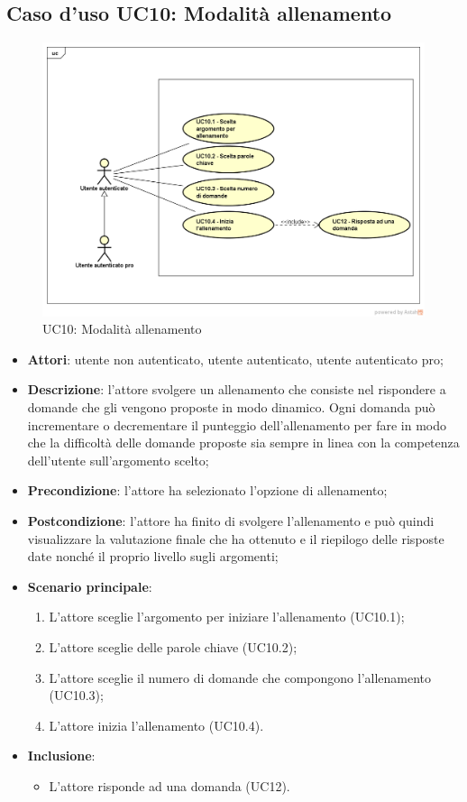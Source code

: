 \subsection{Caso d'uso UC10: Modalità allenamento}
\label{UC10}
	\begin{figure}
	\centering
	\includegraphics[scale=0.5]{UML/UC10.png}
	\caption{UC10: Modalità allenamento}
	\end{figure}
\FloatBarrier
\begin{itemize}
\item\textbf{Attori}: utente non autenticato, utente autenticato, utente autenticato pro;
\item\textbf{Descrizione}: l'attore svolgere un allenamento che consiste nel rispondere a domande che gli vengono proposte in modo dinamico. Ogni domanda può incrementare o decrementare il punteggio dell'allenamento per fare in modo che la difficoltà delle domande proposte sia sempre in linea con la competenza dell'utente sull'argomento scelto;
\item\textbf{Precondizione}: l'attore ha selezionato l'opzione di allenamento;
\item\textbf{Postcondizione}: l'attore ha finito di svolgere l'allenamento e può quindi visualizzare la valutazione finale che ha ottenuto e il riepilogo delle risposte date nonché il proprio livello sugli argomenti;
\item\textbf{Scenario principale}:
	\begin{enumerate}
		\item L'attore sceglie l'argomento per iniziare l'allenamento (UC10.1);
		\item L'attore sceglie delle parole chiave (UC10.2);
		\item L'attore sceglie il numero di domande che compongono l'allenamento (UC10.3);
		\item L'attore inizia l'allenamento (UC10.4).
	\end{enumerate}
\item \textbf{Inclusione}:
	\begin{itemize}
		\item L'attore risponde ad una domanda (UC12).
	\end{itemize}
\end{itemize}

